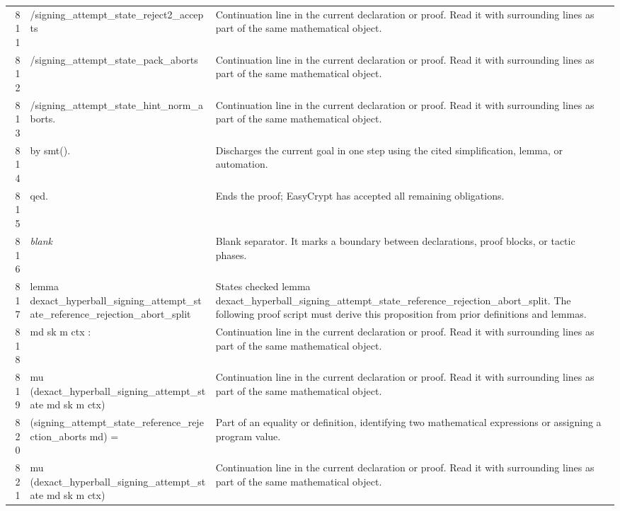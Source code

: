 \documentclass[10pt]{article}
\begin{document}
\begin{longtable}{r L{0.53\textwidth} L{0.37\textwidth}}
811 & {\ttfamily\scriptsize         /signing\_attempt\_state\_reject2\_accepts} & Continuation line in the current declaration or proof.  Read it with surrounding lines as part of the same mathematical object. \\
812 & {\ttfamily\scriptsize         /signing\_attempt\_state\_pack\_aborts} & Continuation line in the current declaration or proof.  Read it with surrounding lines as part of the same mathematical object. \\
813 & {\ttfamily\scriptsize         /signing\_attempt\_state\_hint\_norm\_aborts.} & Continuation line in the current declaration or proof.  Read it with surrounding lines as part of the same mathematical object. \\
814 & {\ttfamily\scriptsize by smt().} & Discharges the current goal in one step using the cited simplification, lemma, or automation. \\
815 & {\ttfamily\scriptsize qed.} & Ends the proof; EasyCrypt has accepted all remaining obligations. \\
816 & {\ttfamily\scriptsize \emph{blank}} & Blank separator.  It marks a boundary between declarations, proof blocks, or tactic phases. \\
817 & {\ttfamily\scriptsize lemma dexact\_hyperball\_signing\_attempt\_state\_reference\_rejection\_abort\_split} & States checked lemma dexact\_hyperball\_signing\_attempt\_state\_reference\_rejection\_abort\_split.  The following proof script must derive this proposition from prior definitions and lemmas. \\
818 & {\ttfamily\scriptsize   md sk m ctx :} & Continuation line in the current declaration or proof.  Read it with surrounding lines as part of the same mathematical object. \\
819 & {\ttfamily\scriptsize   mu (dexact\_hyperball\_signing\_attempt\_state md sk m ctx)} & Continuation line in the current declaration or proof.  Read it with surrounding lines as part of the same mathematical object. \\
820 & {\ttfamily\scriptsize     (signing\_attempt\_state\_reference\_rejection\_aborts md) =} & Part of an equality or definition, identifying two mathematical expressions or assigning a program value. \\
821 & {\ttfamily\scriptsize   mu (dexact\_hyperball\_signing\_attempt\_state md sk m ctx)} & Continuation line in the current declaration or proof.  Read it with surrounding lines as part of the same mathematical object. \\

\end{longtable}
\end{document}
